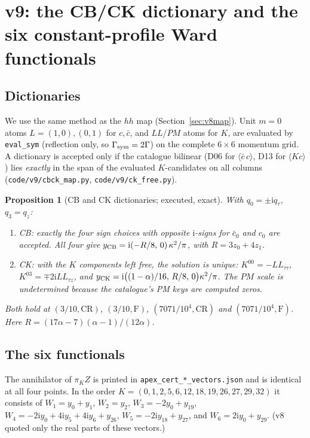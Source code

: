 \documentclass[11pt,a4paper]{article}
\newcommand{\ii}{\mathrm i}
\newcommand{\Fr}{\mathrm F}
\newcommand{\CR}{\mathrm{CR}}
\newcommand{\loc}[1]{\nolinkurl{#1}}
\theoremstyle{plain}
\newtheorem{proposition}[theorem]{Proposition}
\theoremstyle{definition}
\theoremstyle{remark}
\numberwithin{equation}{section}
\begin{document}
\section{v9: the CB/CK dictionary and the six constant-profile Ward functionals}
\label{sec:v9ghost}

\subsection{Dictionaries}

We use the same method as the \(hh\) map (Section~\ref{sec:v8map}).
Unit \(m=0\) atoms \(L=(1,0),(0,1)\) for \(c,\bar c\), and
\(LL\)/\(PM\) atoms for \(K\), are evaluated by \loc{eval_sym}
(reflection only, so \(\Gamma_{\rm sym}=2\Gamma\)) on the complete
\(6\times6\) momentum grid. A dictionary is accepted only if the
catalogue bilinear (D06 for \(\langle\bar c\,c\rangle\), D13 for
\(\langle K c\rangle\)) lies \emph{exactly} in the span of the
evaluated \(K\)-candidates on all columns
(\loc{code/v9/cbck_map.py}, \loc{code/v9/ck_free.py}).

\begin{proposition}[CB and CK dictionaries; executed, exact]
\label{prop:v9dict}
With \(q_0=\pm\ii q_\tau\), \(q_3=q_z\):
\begin{enumerate}[label=(\roman*)]
\item CB: exactly the four sign choices with opposite \(\ii\)-signs
for \(\bar c_0\) and \(c_0\) are accepted. All four give
\(y_{\rm CB}=\ii(-R/8,\,0)\,\kappa^2/\pi\), with \(R=3z_0+4z_1\).
\item CK: with the \(K\) components left free, the solution is
unique: \(K^{00}=-LL_{\tau\tau}\), \(K^{03}=\mp2\ii LL_{\tau z}\), and
\(y_{\rm CK}=\ii\bigl((1-\alpha)/16,\,R/8,\,0\bigr)\kappa^2/\pi\).
The \(PM\) scale is undetermined because the catalogue's PM keys
are computed zeros.
\end{enumerate}
Both hold at \((3/10,\CR)\), \((3/10,\Fr)\), \((7071/10^4,\CR)\) and
\((7071/10^4,\Fr)\). Here
\(R=(17\alpha-7)(\alpha-1)/(12\alpha)\).
\end{proposition}

\subsection{The six functionals}

The annihilator of \(\pi_KZ\) is printed in
\loc{apex_cert_*_vectors.json} and is identical at all four
points. In the order
\(K=(0,1,2,5,6,12,18,19,26,27,29,32)\) it consists of
\(W_1=y_0+y_1\), \(W_2=y_2\), \(W_3=-2y_0+y_{19}\),
\(W_4=-2\ii y_0+4\ii y_5+4\ii y_6+y_{26}\),
\(W_5=-2\ii y_{18}+y_{27}\), and \(W_6=2\ii y_0+y_{29}\). (v8
quoted only the real parts of these vectors.)
\end{document}
